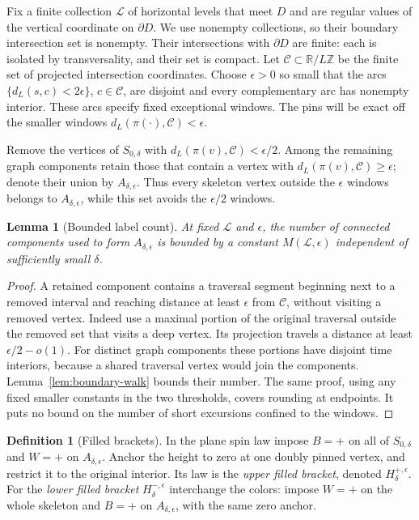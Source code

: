 \documentclass[11pt]{article}
\newtheorem{lemma}[theorem]{Lemma}
\theoremstyle{definition}
\newtheorem{definition}[theorem]{Definition}
\theoremstyle{remark}
\numberwithin{equation}{section}
\begin{document}
Fix a finite collection $\mathcal L$ of horizontal levels that meet
$D$ and are regular values of the vertical coordinate on $\partial D$.
We use nonempty collections, so their boundary intersection set is
nonempty.  Their
intersections with $\partial D$ are finite: each is isolated by
transversality, and their set is compact.  Let $\mathcal C\subset\mathbb R/L\mathbb Z$
be the finite set of projected intersection coordinates.  Choose
$\epsilon>0$ so small that the arcs
$\{d_L(s,c)<2\epsilon\}$, $c\in\mathcal C$, are disjoint and every
complementary arc has nonempty interior.  These arcs specify fixed
exceptional windows.  The pins will be exact off the smaller windows
$d_L(\pi(\cdot),\mathcal C)<\epsilon$.

Remove the vertices of $S_{0,\delta}$ with
$d_L(\pi(v),\mathcal C)<\epsilon/2$.  Among the remaining graph
components retain those that contain a vertex with
$d_L(\pi(v),\mathcal C)\ge\epsilon$; denote their union by
$A_{\delta,\epsilon}$.  Thus every skeleton vertex outside the
$\epsilon$ windows belongs to $A_{\delta,\epsilon}$, while this set
avoids the $\epsilon/2$ windows.

\begin{lemma}[Bounded label count]\label{pins:label-count}
At fixed $\mathcal L$ and $\epsilon$, the number of connected
components used to form $A_{\delta,\epsilon}$ is bounded by a constant
$M(\mathcal L,\epsilon)$ independent of sufficiently small $\delta$.
\end{lemma}

\begin{proof}
A retained component contains a traversal segment beginning next to a
removed interval and reaching distance at least $\epsilon$ from
$\mathcal C$, without visiting a removed vertex.  Indeed use a maximal
portion of the original traversal outside the removed set that visits
a deep vertex.  Its projection travels a distance at least
$\epsilon/2-o(1)$.  For distinct graph components these portions have
disjoint time interiors, because a shared traversal vertex would join
the components.  Lemma~\ref{lem:boundary-walk} bounds their number.
The same proof, using any fixed smaller constants in the two thresholds,
covers rounding at endpoints.  It puts no bound on the number of short
excursions confined to the windows.
\end{proof}

\begin{definition}[Filled brackets]\label{def:brackets}
In the plane spin law impose $B=+$ on all of $S_{0,\delta}$ and $W=+$
on $A_{\delta,\epsilon}$.  Anchor the height to zero at one doubly pinned
vertex, and restrict it to the original interior.  Its law is the
\emph{upper filled bracket}, denoted $H_\delta^{+,\epsilon}$.  For the
\emph{lower filled bracket} $H_\delta^{-,\epsilon}$ interchange the
colors: impose $W=+$ on the whole skeleton and $B=+$ on
$A_{\delta,\epsilon}$, with the same zero anchor.
\end{definition}
\end{document}
